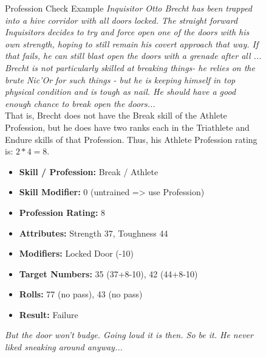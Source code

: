 \begin{figure}[hb]
	\begin{DndSidebar}{Profession Check Example}
	\textit{Inquisitor Otto Brecht has been trapped into a hive corridor with all doors locked. The straight forward Inquisitors decides to try and force open one of the doors with his own strength, hoping to still remain his covert approach that way. If that fails, he can still blast open the doors with a grenade after all ...\\
	Brecht is not particularly skilled at breaking things- he relies on the brute Nic'Or for such things - but he is keeping himself in top physical condition and is tough as nail. He should have a good enough chance to break open the doors...}\\
	That is, Brecht does not have the Break skill of the Athlete Profession, but he does have two ranks each in the Triathlete and Endure skills of that Profession. Thus, his Athlete Profession rating is: $2*4=8$.
		\begin{itemize}
		\item \textbf{Skill / Profession:} Break / Athlete
		\item \textbf{Skill Modifier:} 0 (untrained => use Profession)
		\item \textbf{Profession Rating:} 8
		\item \textbf{Attributes:} Strength 37, Toughness 44
		\item \textbf{Modifiers:} Locked Door (-10)
		\item \textbf{Target Numbers:} 35 (37+8-10), 42 (44+8-10)
		\item \textbf{Rolls:} 77 (no pass), 43 (no pass)
		\item \textbf{Result:} Failure
	\end{itemize}
	\textit{But the door won't budge. Going loud it is then. So be it. He never liked sneaking around anyway...}
	\end{DndSidebar}
\end{figure}

